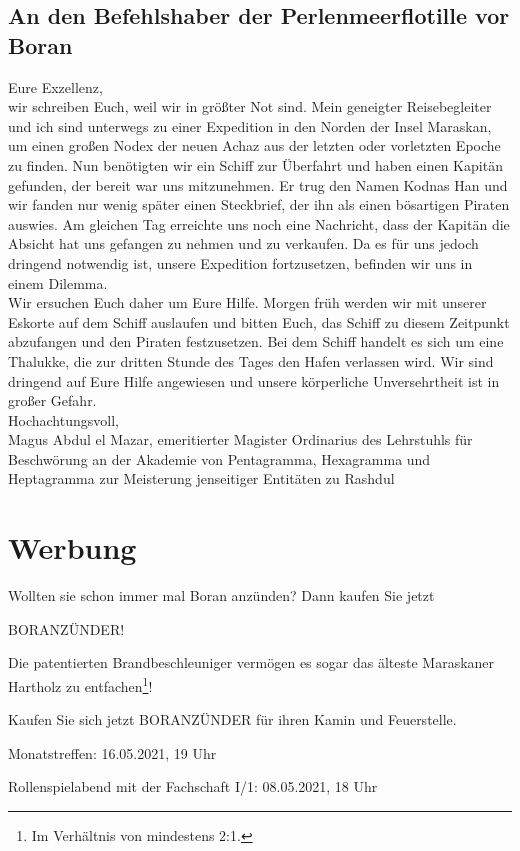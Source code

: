 \documentclass[final]{multiversum}
\begin{document}
\subsection{An den Befehlshaber der Perlenmeerflotille vor Boran}
Eure Exzellenz,\\[1em]
wir schreiben Euch, weil wir in größter Not sind.
Mein geneigter Reisebegleiter und ich sind unterwegs zu einer Expedition in den Norden der Insel Maraskan, um einen großen Nodex der neuen Achaz aus der letzten oder vorletzten Epoche zu finden.
Nun benötigten wir ein Schiff zur Überfahrt und haben einen Kapitän gefunden, der bereit war uns mitzunehmen.
Er trug den Namen Kodnas Han und wir fanden nur wenig später einen Steckbrief, der ihn als einen bösartigen Piraten auswies.
Am gleichen Tag erreichte uns noch eine Nachricht, dass der Kapitän die Absicht hat uns gefangen zu nehmen und zu verkaufen.
Da es für uns jedoch dringend notwendig ist, unsere Expedition fortzusetzen, befinden wir uns in einem Dilemma.\\
Wir ersuchen Euch daher um Eure Hilfe.
Morgen früh werden wir mit unserer Eskorte auf dem Schiff auslaufen und bitten Euch, das Schiff zu diesem Zeitpunkt abzufangen und den Piraten festzusetzen.
Bei dem Schiff handelt es sich um eine Thalukke, die zur dritten Stunde des Tages den Hafen verlassen wird.
Wir sind dringend auf Eure Hilfe angewiesen und unsere körperliche Unversehrtheit ist in großer Gefahr.\\[1em]
Hochachtungsvoll,\\[1em]
Magus Abdul el Mazar, emeritierter Magister Ordinarius des Lehrstuhls für Beschwörung an der Akademie von Pentagramma, Hexagramma und Heptagramma zur Meisterung jenseitiger Entitäten zu Rashdul
\newpage

\section{Werbung}
Wollten sie schon immer mal Boran anzünden? Dann kaufen Sie jetzt

\begin{center}\textsc{BORANZÜNDER}!\end{center}

Die patentierten Brandbeschleuniger vermögen es sogar das älteste Maraskaner Hartholz zu entfachen\footnote{Im Verhältnis von mindestens 2:1.}!

Kaufen Sie sich jetzt BORANZÜNDER für ihren Kamin und Feuerstelle. 

\begin{termine}
\item Monatstreffen: 16.05.2021, 19 Uhr
\item Rollenspielabend mit der Fachschaft I/1: 08.05.2021, 18 Uhr
\end{termine}
\impressum
\end{document}
